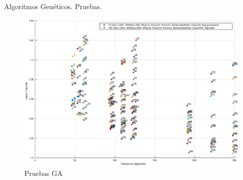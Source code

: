 \documentclass{beamer}
\begin{document}
\begin{frame}{Algoritmos Genéticos. Pruebas.}
  \begin{center}
    \begin{figure}
      \includegraphics[scale=0.28]{../GA/statsGA.eps}
      \caption{Pruebas GA}
      \label{fig:statsGA}
    \end{figure}
  \end{center}
\end{frame}
\end{document}
